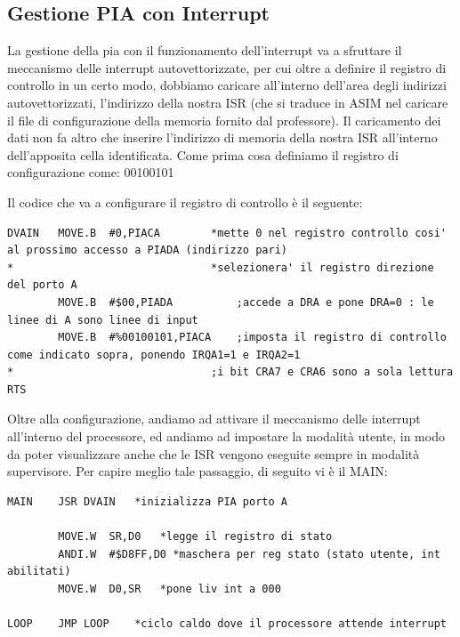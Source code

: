 \newpage

\subsection{Gestione PIA con Interrupt}\label{par:PIA-POL}
La gestione della pia con il funzionamento dell'interrupt va a sfruttare il meccanismo delle interrupt autovettorizzate, per cui oltre a definire il registro di controllo in un certo modo, dobbiamo caricare all'interno dell'area degli indirizzi autovettorizzati, l'indirizzo della nostra ISR (che si traduce in ASIM nel caricare il file di configurazione della memoria fornito dal professore). Il caricamento dei dati non fa altro che inserire l'indirizzo di memoria della nostra ISR all'interno dell'apposita cella identificata.
Come prima cosa definiamo il registro di configurazione come: 00100101

Il codice che va a configurare il registro di controllo è il seguente:
\begin{lstlisting}
DVAIN	MOVE.B	#0,PIACA		*mette 0 nel registro controllo cosi' al prossimo accesso a PIADA (indirizzo pari)
*								*selezionera' il registro direzione del porto A
        MOVE.B	#$00,PIADA		    ;accede a DRA e pone DRA=0 : le linee di A sono linee di input	
        MOVE.B	#%00100101,PIACA  	;imposta il registro di controllo come indicato sopra, ponendo IRQA1=1 e IRQA2=1
*								;i bit CRA7 e CRA6 sono a sola lettura	
RTS
\end{lstlisting}

Oltre alla configurazione, andiamo ad attivare il meccanismo delle interrupt all'interno del processore, ed andiamo ad impostare la modalità utente, in modo da poter visualizzare anche che le ISR vengono eseguite sempre in modalità supervisore. Per capire meglio tale passaggio, di seguito vi è il MAIN:
\begin{lstlisting}
MAIN	JSR	DVAIN	*inizializza PIA porto A
            
        MOVE.W	SR,D0	*legge il registro di stato
        ANDI.W	#$D8FF,D0 *maschera per reg stato (stato utente, int abilitati)
        MOVE.W	D0,SR	*pone liv int a 000

LOOP  	JMP LOOP	*ciclo caldo dove il processore attende interrupt	
\end{lstlisting}

